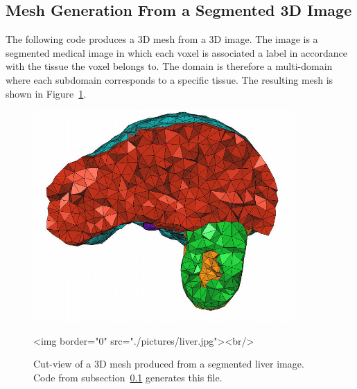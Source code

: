 \subsection{Mesh Generation From a Segmented 3D Image}
\label{Mesh_3_subsection_examples_3d_image}
The following code produces  a 3D mesh from
a 3D image. The image is a segmented medical image  in which each 
voxel  is associated a label  in accordance with
the tissue  the voxel belongs to.
The domain is therefore a multi-domain
where each subdomain corresponds to a specific tissue.
The resulting mesh is shown in Figure~\ref{figure:liver_3d_image_mesh}.


\begin{figure}[ht]
\begin{center}
 \begin{ccTexOnly}
   \includegraphics[width=10cm]{Mesh_3/pictures/liver}
 \end{ccTexOnly}
 \begin{ccHtmlOnly}
   <img border="0" src="./pictures/liver.jpg"><br/>
 \end{ccHtmlOnly}
 \caption{Cut-view of a 3D mesh produced from a segmented liver image. Code from
 subsection~\ref{Mesh_3_subsection_examples_3d_image} generates this file.}
  \label{figure:liver_3d_image_mesh}
\end{center}
\end{figure}



